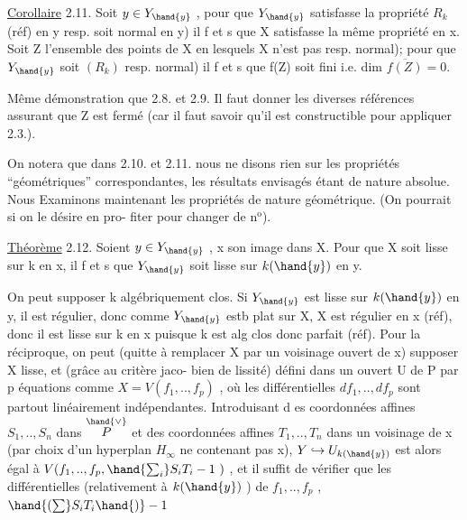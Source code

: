 
\uline{Corollaire} 2.11. Soit $y\in Y_{\hand{y}}$ , pour que $Y_{\hand{y}}$  satisfasse la propriété
$R_k$ (réf) en y\hand{,} \deleted{(}resp. soit normal en y) il f et s que X satisfasse
la même propriété en x.  Soit Z l'ensemble des points de X en
lesquels X n'est pas resp.  normal); pour que $Y_{\hand{y}}$ soit
 $(R_k)$\hand{,} \deleted{(}resp. normal) il f et s que f(Z) soit fini i.e. dim $\overline{f(Z)}=0$.

\margin{|} Même démonstration que 2.8. et 2.9. Il faut donner les diverses
références assurant que Z est fermé (car il faut savoir qu'il est
constructible pour appliquer 2.3.).

 On notera que dans 2.10. et 2.11. nous ne disons rien
sur les propriétés ``géométriques'' correspondantes, les résultats
envisagés étant de nature absolue. Nous Examinons maintenant les
propriétés de nature géométrique. (On pourrait si on le désire en pro-%
\margin{||}fiter pour changer de n$^{\text{o}}$).

\uline{Théorème} 2.12. Soient $y\in Y_{\hand{y}}$ , x son image dans X. Pour que X soit
lisse sur k en x, il f et s que $Y_{\hand{y}}$ soit lisse sur $k(\hand{y})$ en y.

On peut supposer k algébriquement clos. Si $Y_{\hand{y}}$ est lisse sur $k(\hand{y})$
en y, il est régulier, donc comme $Y_{\hand{y}}$ estb plat sur X, X est régulier
en x (réf), donc il est lisse sur k en x puisque k est alg clos donc
parfait (réf). Pour la réciproque, on peut (quitte à remplacer X par
un voisinage ouvert de x) supposer X lisse, et (grâce au critère jaco-%
bien de lissité) défini dans un ouvert U de P par p équations
comme $X=V(f_1,..,f_p)$ , où les différentielles $df_1,..,df_p$ sont
partout linéairement indépendantes. Introduisant d es coordonnées affines
$S_1,..,S_n$ dans $\overset{\hand{\vee}}{P}$ et des coordonnées affines $T_1,..,T_n$ dans un voisinage
de x (par choix d'un hyperplan $H_\infty$ ne contenant pas x), $Y\hookrightarrow U_{k(\hand{y})}$ est
alors égal à $V(f_1,..,f_p,\hand{\sum_i}S_iT_i-1\ )$ , et il suffit de vérifier que
les différentielles (relativement à $k(\hand{y})$ ) de $f_1,..,f_p$ ,$\hand{(\sum}S_iT_i\hand{)}-1$

